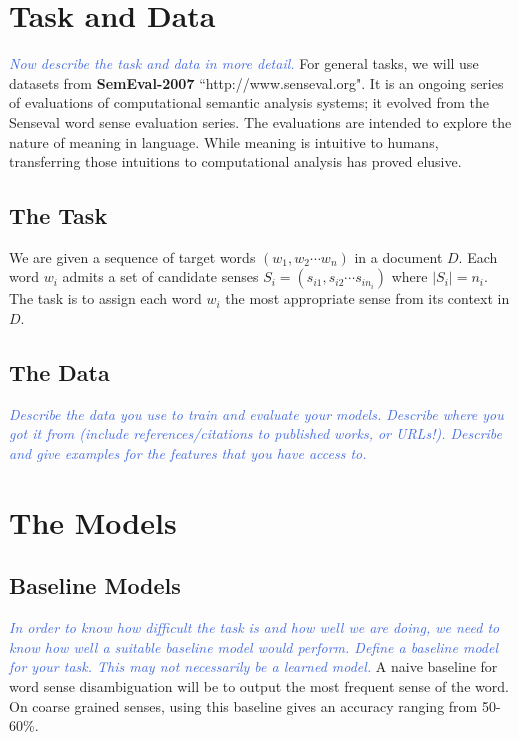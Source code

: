 \documentclass[11pt,letterpaper]{article}
\newcommand{\blue}[1]{\textcolor{RoyalBlue}{#1}}
\newcommand{\instructions}[1]{\blue{\textit{#1}}}
\begin{document}
\section{Task and Data}
\label{sec:taskAndData}
\instructions{Now describe the task and data in more detail.}
For general tasks, we will use datasets from \textbf{SemEval-2007} ``http://www.senseval.org". It is an ongoing series of evaluations of computational semantic analysis systems; it evolved from the Senseval word sense evaluation series. The evaluations are intended to explore the nature of meaning in language. While meaning is intuitive to humans, transferring those intuitions to computational analysis has proved elusive.

\subsection{The Task}
\label{sec:task}
We are given a sequence of target words $(w_1,w_2 \cdots w_n)$ in a document $D$. Each word $w_i$ admits a set of candidate senses $S_i=(s_{i1},s_{i2} \cdots s_{in_i})$ where $|S_i|= n_i$. The task is to assign each word $w_i$ the most appropriate sense from its context in $D$. 
\subsection{The Data}
\label{sec:data}
\instructions{Describe the data you use to train and evaluate your models. Describe where you got it from (include references/citations to published works, or URLs!). Describe and give examples for the features that you have access to.} 


\section{The Models}
\label{sec:models}

\subsection{Baseline Models}
\label{sec:baseline-models}
\instructions{In order to know how difficult the task is and how well we are doing, we need to know how well a suitable baseline model would perform. Define a baseline model for your task. This may not necessarily be a learned model.}
A naive baseline for word sense disambiguation will be to output the most frequent sense of the word. On coarse grained senses, using this baseline gives an accuracy ranging from 50-60\%.
\end{document}
